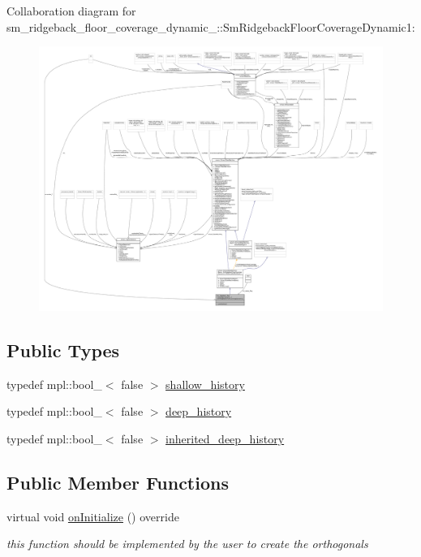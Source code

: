 Collaboration diagram for sm\+\_\+ridgeback\+\_\+floor\+\_\+coverage\+\_\+dynamic\+\_\+:\+:Sm\+Ridgeback\+Floor\+Coverage\+Dynamic1\+:
\nopagebreak
\begin{figure}[H]
\begin{center}
\leavevmode
\includegraphics[width=350pt]{structsm__ridgeback__floor__coverage__dynamic__1_1_1SmRidgebackFloorCoverageDynamic1__coll__graph}
\end{center}
\end{figure}
\subsection*{Public Types}
\begin{DoxyCompactItemize}
\item 
typedef mpl\+::bool\+\_\+$<$ false $>$ \hyperlink{structsm__ridgeback__floor__coverage__dynamic__1_1_1SmRidgebackFloorCoverageDynamic1_aa128c6e2d51521e9355484d7b7c1c1e9}{shallow\+\_\+history}
\item 
typedef mpl\+::bool\+\_\+$<$ false $>$ \hyperlink{structsm__ridgeback__floor__coverage__dynamic__1_1_1SmRidgebackFloorCoverageDynamic1_a41107df9b45049b5095afccc0d5f2780}{deep\+\_\+history}
\item 
typedef mpl\+::bool\+\_\+$<$ false $>$ \hyperlink{structsm__ridgeback__floor__coverage__dynamic__1_1_1SmRidgebackFloorCoverageDynamic1_a99ba17b938d2e7b3b51751d65f48567a}{inherited\+\_\+deep\+\_\+history}
\end{DoxyCompactItemize}
\subsection*{Public Member Functions}
\begin{DoxyCompactItemize}
\item 
virtual void \hyperlink{structsm__ridgeback__floor__coverage__dynamic__1_1_1SmRidgebackFloorCoverageDynamic1_ae23fc2975914c6d54c4dd14020a190a4}{on\+Initialize} () override
\begin{DoxyCompactList}\small\item\em this function should be implemented by the user to create the orthogonals \end{DoxyCompactList}\end{DoxyCompactItemize}
